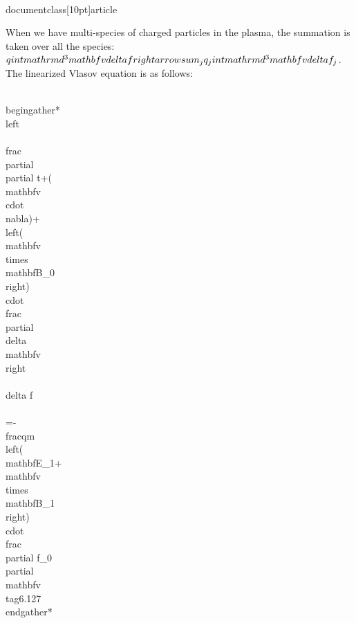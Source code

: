 \\documentclass[10pt]{article}
\begin{document}
{{{{When we have multi-species of charged particles in the plasma, the summation is taken over all the species: $q \\int \\mathrm{d}^{3} \\mathbf{v} \\delta f \\rightarrow \\sum_{j} q_{j} \\int \\mathrm{d}^{3} \\mathbf{v} \\delta f_{j}$. The linearized Vlasov equation is as follows:


\\begin{gather*}
\\left\\{\\frac{\\partial}{\\partial t}+(\\mathbf{v} \\cdot \\nabla)+\\left(\\mathbf{v} \\times \\mathbf{B}_{0}\\right) \\cdot \\frac{\\partial}{\\delta \\mathbf{v}}\\right\\} \\delta f \\\\
=-\\frac{q}{m}\\left(\\mathbf{E}_{1}+\\mathbf{v} \\times \\mathbf{B}_{1}\\right) \\cdot \\frac{\\partial f_{0}}{\\partial \\mathbf{v}} \\tag{6.127}
\\end{gather*}


}}}}
\end{document}
